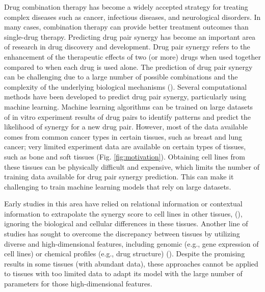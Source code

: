 {Drug combination therapy has become a widely accepted strategy for treating complex diseases such as cancer, infectious diseases, and neurological disorders. In many cases, combination therapy can provide better treatment outcomes than single-drug therapy. Predicting drug pair synergy has become an important area of research in drug discovery and development. Drug pair synergy refers to the enhancement of the therapeutic effects of two (or more) drugs when used together compared to when each drug is used alone. The prediction of drug pair synergy can be challenging due to a large number of possible combinations and the complexity of the underlying biological mechanisms (\cite{zagidullin_drugcomb_2019}). Several computational methods have been developed to predict drug pair synergy, particularly using machine learning. Machine learning algorithms can be trained on large datasets of in vitro experiment results of drug pairs to identify patterns and predict the likelihood of synergy for a new drug pair. However, most of the data available comes from common cancer types in certain tissues, such as breast and lung cancer; very limited experiment data are available on certain types of tissues, such as bone and soft tissues (Fig. \ref{fig:motivation}). Obtaining cell lines from these tissues can be physically difficult and expensive, which limits the number of training data available for drug pair synergy prediction. This can make it challenging to train machine learning models that rely on large datasets. 

Early studies in this area have relied on relational information or contextual information to extrapolate the synergy score to cell lines in other tissues, (\cite{chen_drugcom_2018, 10.1093/bioinformatics/btaa287, li_network_2018, kuru_matchmaker_2022, 10.1093/bioinformatics/btac579}), ignoring the biological and cellular differences in these tissues. Another line of studies has sought to overcome the discrepancy between tissues by utilizing diverse and high-dimensional features, including genomic (e.g., gene expression of cell lines) or chemical profiles (e.g., drug structure) (\cite{preuer_deepsynergy_2018, liu_transynergy_2021, kuru_matchmaker_2022, hosseini_ccsynergy_2023, kim_anticancer_2021}). Despite the promising results in some tissues (with abundant data), these approaches cannot be applied to tissues with too limited data to adapt its model with the large number of parameters for those high-dimensional features. 

}
